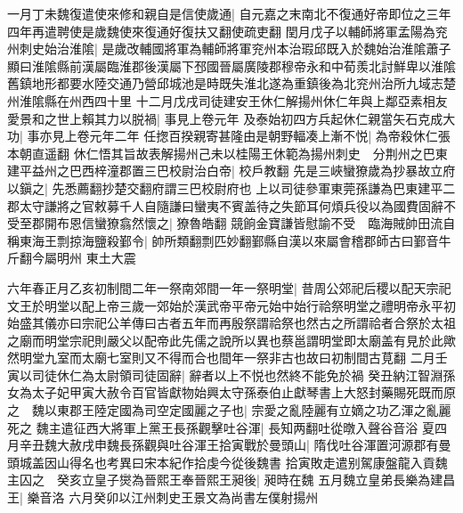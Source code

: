 一月丁未魏復遣使來修和親自是信使歲通|{
	自元嘉之末南北不復通好帝即位之三年四年再遣聘使是歲魏使來復通好復扶又翻使疏吏翻}
閏月戊子以輔師將軍孟陽為兖州刺史始治淮隂|{
	是歲改輔國將軍為輔師將軍兖州本治瑕邱既入於魏始治淮隂蕭子顯曰淮隂縣前漢屬臨淮郡後漢屬下邳國晉屬廣陵郡穆帝永和中荀羨北討鮮卑以淮隂舊鎮地形都要水陸交通乃營邱城池是時既失淮北遂為重鎮後為北兖州治所九域志楚州淮隂縣在州西四十里}
十二月戊戌司徒建安王休仁解揚州休仁年與上鄰亞素相友愛景和之世上賴其力以脱禍|{
	事見上卷元年}
及泰始初四方兵起休仁親當矢石克成大功|{
	事亦見上卷元年二年}
任揔百揆親寄甚隆由是朝野輻凑上漸不悦|{
	為帝殺休仁張本朝直遥翻}
休仁悟其旨故表解揚州己未以桂陽王休範為揚州刺史　分荆州之巴東建平益州之巴西梓潼郡置三巴校尉治白帝|{
	校戶教翻}
先是三峽蠻獠歲為抄暴故立府以鎭之|{
	先悉薦翻抄楚交翻府謂三巴校尉府也}
上以司徒參軍東莞孫謙為巴東建平二郡太守謙將之官敕募千人自隨謙曰蠻夷不賓盖待之失節耳何煩兵役以為國費固辭不受至郡開布恩信蠻獠翕然懷之|{
	獠魯皓翻}
競餉金寶謙皆慰諭不受　臨海賊帥田流自稱東海王剽掠海鹽殺鄞令|{
	帥所類翻剽匹妙翻鄞縣自漢以來屬會稽郡師古曰鄞音牛斤翻今屬明州}
東土大震

六年春正月乙亥初制間二年一祭南郊間一年一祭明堂|{
	昔周公郊祀后稷以配天宗祀文王於明堂以配上帝三歲一郊始於漢武帝平帝元始中始行祫祭明堂之禮明帝永平初始盛其儀亦曰宗祀公羊傳曰古者五年而再殷祭謂祫祭也然古之所謂祫者合祭於太祖之廟而明堂宗祀則嚴父以配帝此先儒之說所以異也蔡邕謂明堂即太廟盖有見於此歟然明堂九室而太廟七室則又不得而合也間年一祭非古也故曰初制間古莧翻}
二月壬寅以司徒休仁為太尉領司徒固辭|{
	辭者以上不悦也然終不能免於禍}
癸丑納江智淵孫女為太子妃甲寅大赦令百官皆獻物始興太守孫泰伯止獻琴書上大怒封藥賜死既而原之　魏以東郡王陸定國為司空定國麗之子也|{
	宗愛之亂陸麗有立嫡之功乙渾之亂麗死之}
魏主遣征西大將軍上黨王長孫觀擊吐谷渾|{
	長知两翻吐從暾入聲谷音浴}
夏四月辛丑魏大赦戌申魏長孫觀與吐谷渾王拾寅戰於曼頭山|{
	隋伐吐谷渾置河源郡有曼頭城盖因山得名也考異曰宋本紀作拾虔今從後魏書}
拾寅敗走遣别駕康盤龍入貢魏主囚之　癸亥立皇子爕為晉熙王奉晉熙王昶後|{
	昶時在魏}
五月魏立皇弟長樂為建昌王|{
	樂音洛}
六月癸卯以江州刺史王景文為尚書左僕射揚州

